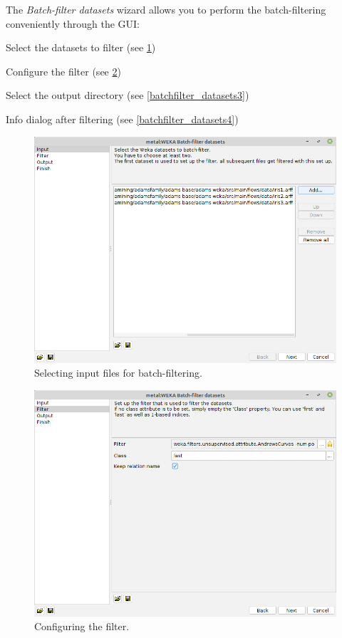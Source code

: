 The \textit{Batch-filter datasets} wizard allows you to perform the
batch-filtering conveniently through the GUI:
\begin{tight_itemize}
  \item Select the datasets to filter (see \ref{batchfilter_datasets1})
  \item Configure the filter (see \ref{batchfilter_datasets2})
  \item Select the output directory (see \ref{batchfilter_datasets3})
  \item Info dialog after filtering (see \ref{batchfilter_datasets4})
\end{tight_itemize}

\begin{figure}[htb]
  \centering
  \includegraphics[width=12.0cm]{images/batchfilter_datasets1.png}
  \caption{Selecting input files for batch-filtering.}
  \label{batchfilter_datasets1}
\end{figure}

\begin{figure}[htb]
  \centering
  \includegraphics[width=12.0cm]{images/batchfilter_datasets2.png}
  \caption{Configuring the filter.}
  \label{batchfilter_datasets2}
\end{figure}

